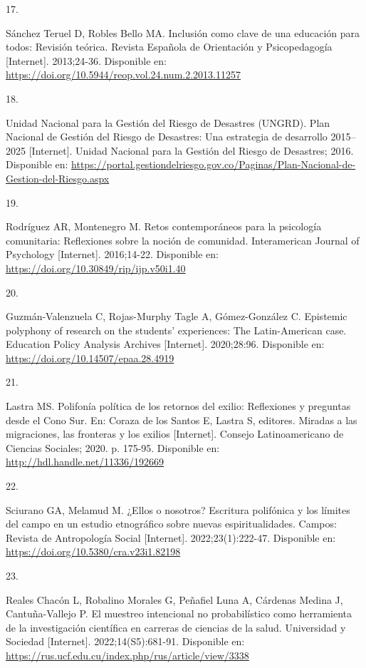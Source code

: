 \documentclass[
  spanish,
  letterpaper,
]{book}
\newlength{\cslhangindent}
\newlength{\csllabelwidth}
\newenvironment{CSLReferences}[2] %
 {\begin{list}{}{%
  \setlength{\itemindent}{0pt}
  \setlength{\leftmargin}{0pt}
  \setlength{\parsep}{0pt}
  \ifodd #1
   \setlength{\leftmargin}{\cslhangindent}
   \setlength{\itemindent}{-1\cslhangindent}
  \fi
  \setlength{\itemsep}{#2\baselineskip}}}
 {\end{list}}
\newcommand{\CSLLeftMargin}[1]{\parbox[t]{\csllabelwidth}{\strut#1\strut}}
\newcommand{\CSLRightInline}[1]{\parbox[t]{\linewidth - \csllabelwidth}{\strut#1\strut}}
\begin{document}
\begin{CSLReferences}{0}{1}
\CSLLeftMargin{17. }%
\CSLRightInline{Sánchez Teruel D, Robles Bello MA. Inclusión como clave
de una educación para todos: Revisión teórica. Revista Española de
Orientación y Psicopedagogía {[}Internet{]}. 2013;24-36. Disponible en:
\url{https://doi.org/10.5944/reop.vol.24.num.2.2013.11257}}

\CSLLeftMargin{18. }%
\CSLRightInline{Unidad Nacional para la Gestión del Riesgo de Desastres
(UNGRD). Plan Nacional de Gestión del Riesgo de Desastres: Una
estrategia de desarrollo 2015--2025 {[}Internet{]}. Unidad Nacional para
la Gestión del Riesgo de Desastres; 2016. Disponible en:
\url{https://portal.gestiondelriesgo.gov.co/Paginas/Plan-Nacional-de-Gestion-del-Riesgo.aspx}}

\CSLLeftMargin{19. }%
\CSLRightInline{Rodríguez AR, Montenegro M. Retos contemporáneos para la
psicología comunitaria: Reflexiones sobre la noción de comunidad.
Interamerican Journal of Psychology {[}Internet{]}. 2016;14-22.
Disponible en: \url{https://doi.org/10.30849/rip/ijp.v50i1.40}}

\CSLLeftMargin{20. }%
\CSLRightInline{Guzmán-Valenzuela C, Rojas-Murphy Tagle A,
Gómez-González C. Epistemic polyphony of research on the students'
experiences: The Latin-American case. Education Policy Analysis Archives
{[}Internet{]}. 2020;28:96. Disponible en:
\url{https://doi.org/10.14507/epaa.28.4919}}

\CSLLeftMargin{21. }%
\CSLRightInline{Lastra MS. Polifonía política de los retornos del
exilio: Reflexiones y preguntas desde el Cono Sur. En: Coraza de los
Santos E, Lastra S, editores. Miradas a las migraciones, las fronteras y
los exilios {[}Internet{]}. Consejo Latinoamericano de Ciencias
Sociales; 2020. p. 175-95. Disponible en:
\url{http://hdl.handle.net/11336/192669}}

\CSLLeftMargin{22. }%
\CSLRightInline{Sciurano GA, Melamud M. ¿Ellos o nosotros? Escritura
polifónica y los límites del campo en un estudio etnográfico sobre
nuevas espiritualidades. Campos: Revista de Antropología Social
{[}Internet{]}. 2022;23(1):222-47. Disponible en:
\url{https://doi.org/10.5380/cra.v23i1.82198}}

\CSLLeftMargin{23. }%
\CSLRightInline{Reales Chacón L, Robalino Morales G, Peñafiel Luna A,
Cárdenas Medina J, Cantuña-Vallejo P. El muestreo intencional no
probabilístico como herramienta de la investigación científica en
carreras de ciencias de la salud. Universidad y Sociedad {[}Internet{]}.
2022;14(S5):681-91. Disponible en:
\url{https://rus.ucf.edu.cu/index.php/rus/article/view/3338}}


\end{CSLReferences}
\end{document}
